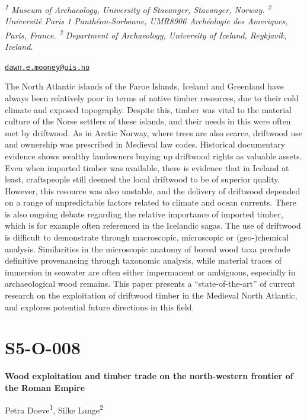 \documentclass[
]{book}
\begin{document}
\emph{\textsuperscript{1} Museum of Archaeology, University of Stavanger, Stavanger, Norway. \textsuperscript{2} Université Paris 1 Panthéon-Sorbonne, UMR8906 Archéologie des Ameriques, Paris, France. \textsuperscript{3} Department of Archaeology, University of Iceland, Reykjavík, Iceland.}

\href{mailto:dawn.e.mooney@uis.no}{\nolinkurl{dawn.e.mooney@uis.no}}

The North Atlantic islands of the Faroe Islands, Iceland and Greenland have always been relatively poor in terms of native timber resources, due to their cold climate and exposed topography. Despite this, timber was vital to the material culture of the Norse settlers of these islands, and their needs in this were often met by driftwood. As in Arctic Norway, where trees are also scarce, driftwood use and ownership was prescribed in Medieval law codes. Historical documentary evidence shows wealthy landowners buying up driftwood rights as valuable assets. Even when imported timber was available, there is evidence that in Iceland at least, craftspeople still deemed the local driftwood to be of superior quality. However, this resource was also unstable, and the delivery of driftwood depended on a range of unpredictable factors related to climate and ocean currents. There is also ongoing debate regarding the relative importance of imported timber, which is for example often referenced in the Icelandic sagas. The use of driftwood is difficult to demonstrate through macroscopic, microscopic or (geo-)chemical analysis. Similarities in the microscopic anatomy of boreal wood taxa preclude definitive provenancing through taxonomic analysis, while material traces of immersion in seawater are often either impermanent or ambiguous, especially in archaeological wood remains. This paper presents a ``state-of-the-art'' of current research on the exploitation of driftwood timber in the Medieval North Atlantic, and explores potential future directions in this field.

\hypertarget{s5-o-008}{%
\section*{S5-O-008}\label{s5-o-008}}

\textbf{Wood exploitation and timber trade on the north-western frontier of the Roman Empire}

Petra Doeve\textsuperscript{1}, Silke Lange\textsuperscript{2}
\end{document}
